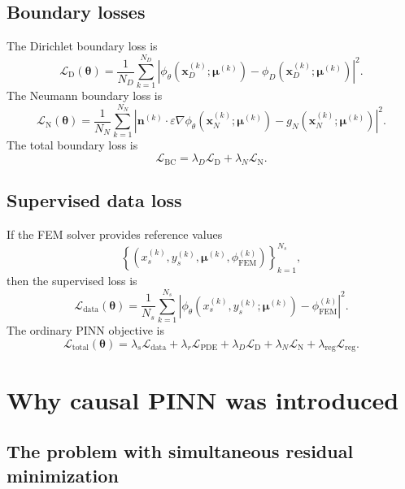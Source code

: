 \documentclass[11pt]{article}
\newcommand{\thetav}{\bm{\theta}}
\newcommand{\xv}{\bm{x}}
\newcommand{\muv}{\bm{\mu}}
\newcommand{\nvecb}{\mathbf{n}}
\newcommand{\phinn}{\phi_{\theta}}
\newcommand{\Ldata}{\mathcal{L}_{\mathrm{data}}}
\newcommand{\Lpde}{\mathcal{L}_{\mathrm{PDE}}}
\newcommand{\Lbc}{\mathcal{L}_{\mathrm{BC}}}
\newcommand{\Ldir}{\mathcal{L}_{\mathrm{D}}}
\newcommand{\Lneu}{\mathcal{L}_{\mathrm{N}}}
\newcommand{\Lreg}{\mathcal{L}_{\mathrm{reg}}}
\newcommand{\Ltot}{\mathcal{L}_{\mathrm{total}}}
\begin{document}
\subsection{Boundary losses}

The Dirichlet boundary loss is
\begin{equation}
\Ldir(\thetav)=\frac{1}{N_D}\sum_{k=1}^{N_D}
\left|\phinn(\xv_D^{(k)};\muv^{(k)})-\phi_D(\xv_D^{(k)};\muv^{(k)})\right|^2.
\label{eq:dirichlet_loss}
\end{equation}
The Neumann boundary loss is
\begin{equation}
\Lneu(\thetav)=\frac{1}{N_N}\sum_{k=1}^{N_N}
\left|\nvecb^{(k)}\cdot\varepsilon\nabla\phinn(\xv_N^{(k)};\muv^{(k)})-g_N(\xv_N^{(k)};\muv^{(k)})\right|^2.
\label{eq:neumann_loss}
\end{equation}
The total boundary loss is
\begin{equation}
\Lbc=\lambda_D\Ldir+\lambda_N\Lneu.
\label{eq:bc_loss}
\end{equation}

\subsection{Supervised data loss}

If the FEM solver provides reference values
\begin{equation}
\left\{\left(x_s^{(k)},y_s^{(k)},\muv^{(k)},\phi_{\mathrm{FEM}}^{(k)}\right)\right\}_{k=1}^{N_s},
\end{equation}
then the supervised loss is
\begin{equation}
\Ldata(\thetav)=\frac{1}{N_s}\sum_{k=1}^{N_s}
\left|\phinn(x_s^{(k)},y_s^{(k)};\muv^{(k)})-\phi_{\mathrm{FEM}}^{(k)}\right|^2.
\label{eq:data_loss}
\end{equation}
The ordinary PINN objective is
\begin{equation}
\Ltot(\thetav)=\lambda_s\Ldata+\lambda_r\Lpde+\lambda_D\Ldir+\lambda_N\Lneu+\lambda_{\mathrm{reg}}\Lreg.
\label{eq:ordinary_total_loss}
\end{equation}

\section{Why causal PINN was introduced}

\subsection{The problem with simultaneous residual minimization}
\end{document}

